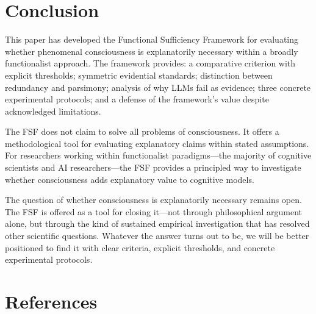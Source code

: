 \documentclass[12pt,a4paper]{article}
\begin{document}
\section{Conclusion}

This paper has developed the Functional Sufficiency Framework for evaluating whether phenomenal consciousness is explanatorily necessary within a broadly functionalist approach. The framework provides: a comparative criterion with explicit thresholds; symmetric evidential standards; distinction between redundancy and parsimony; analysis of why LLMs fail as evidence; three concrete experimental protocols; and a defense of the framework's value despite acknowledged limitations.

The FSF does not claim to solve all problems of consciousness. It offers a methodological tool for evaluating explanatory claims within stated assumptions. For researchers working within functionalist paradigms---the majority of cognitive scientists and AI researchers---the FSF provides a principled way to investigate whether consciousness adds explanatory value to cognitive models.

The question of whether consciousness is explanatorily necessary remains open. The FSF is offered as a tool for closing it---not through philosophical argument alone, but through the kind of sustained empirical investigation that has resolved other scientific questions. Whatever the answer turns out to be, we will be better positioned to find it with clear criteria, explicit thresholds, and concrete experimental protocols.

\section*{References}
\end{document}
